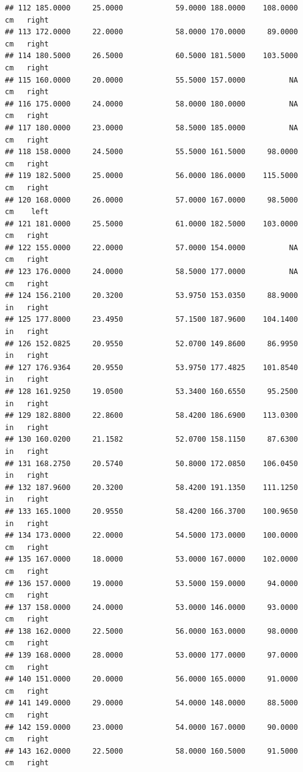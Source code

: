 \documentclass[]{article}
\begin{document}
\begin{verbatim}
## 112 185.0000     25.0000            59.0000 188.0000    108.0000     cm   right
## 113 172.0000     22.0000            58.0000 170.0000     89.0000     cm   right
## 114 180.5000     26.5000            60.5000 181.5000    103.5000     cm   right
## 115 160.0000     20.0000            55.5000 157.0000          NA     cm   right
## 116 175.0000     24.0000            58.0000 180.0000          NA     cm   right
## 117 180.0000     23.0000            58.5000 185.0000          NA     cm   right
## 118 158.0000     24.5000            55.5000 161.5000     98.0000     cm   right
## 119 182.5000     25.0000            56.0000 186.0000    115.5000     cm   right
## 120 168.0000     26.0000            57.0000 167.0000     98.5000     cm    left
## 121 181.0000     25.5000            61.0000 182.5000    103.0000     cm   right
## 122 155.0000     22.0000            57.0000 154.0000          NA     cm   right
## 123 176.0000     24.0000            58.5000 177.0000          NA     cm   right
## 124 156.2100     20.3200            53.9750 153.0350     88.9000     in   right
## 125 177.8000     23.4950            57.1500 187.9600    104.1400     in   right
## 126 152.0825     20.9550            52.0700 149.8600     86.9950     in   right
## 127 176.9364     20.9550            53.9750 177.4825    101.8540     in   right
## 128 161.9250     19.0500            53.3400 160.6550     95.2500     in   right
## 129 182.8800     22.8600            58.4200 186.6900    113.0300     in   right
## 130 160.0200     21.1582            52.0700 158.1150     87.6300     in   right
## 131 168.2750     20.5740            50.8000 172.0850    106.0450     in   right
## 132 187.9600     20.3200            58.4200 191.1350    111.1250     in   right
## 133 165.1000     20.9550            58.4200 166.3700    100.9650     in   right
## 134 173.0000     22.0000            54.5000 173.0000    100.0000     cm   right
## 135 167.0000     18.0000            53.0000 167.0000    102.0000     cm   right
## 136 157.0000     19.0000            53.5000 159.0000     94.0000     cm   right
## 137 158.0000     24.0000            53.0000 146.0000     93.0000     cm   right
## 138 162.0000     22.5000            56.0000 163.0000     98.0000     cm   right
## 139 168.0000     28.0000            53.0000 177.0000     97.0000     cm   right
## 140 151.0000     20.0000            56.0000 165.0000     91.0000     cm   right
## 141 149.0000     29.0000            54.0000 148.0000     88.5000     cm   right
## 142 159.0000     23.0000            54.0000 167.0000     90.0000     cm   right
## 143 162.0000     22.5000            58.0000 160.5000     91.5000     cm   right

\end{verbatim}
\end{document}
